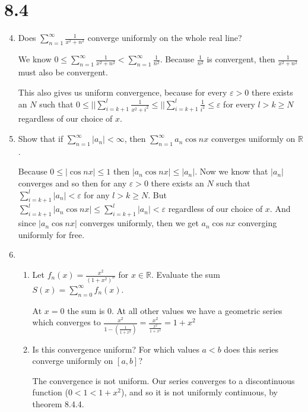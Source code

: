 \documentclass[letterpaper]{article}
\begin{document}
\renewcommand{\labelenumi}{\Alph{enumi}.}
\renewcommand{\labelenumii}{(\alph{enumii})}
\section*{8.4}
\begin{enumerate}
\setcounter{enumi}{3}
\item
Does $\sum\limits_{n=1}^\infty{\frac{1}{x^2+n^2}}$ converge uniformly on the whole real line?

We know $0\le\sum\limits_{n=1}^\infty{\frac{1}{x^2+n^2}} <\sum\limits_{n=1}^\infty{\frac{1}{n^2}}$.
Because $\frac{1}{n^2}$ is convergent, then $\frac{1}{x^2+n^2}$ must also be convergent.

This also gives us uniform convergence, because  for every $\varepsilon>0$ there exists an $N$ such that $0\le||\sum\limits_{i=k+1}^l{\frac{1}{x^2+i^2}}\le ||\sum\limits_{i=k+1}^l{\frac{1}{i^2}}\le \varepsilon$ for every $l>k\ge N$ regardless of our choice of $x$.
\item
Show that if $\sum\limits_{n=1}^\infty{\lvert a_n\rvert}<\infty$, then $\sum\limits_{n=1}^\infty{a_n\cos nx}$ converges uniformly on $\mathbb{R}$.

Because $0\le |\cos nx|\le 1$ then $|a_n\cos nx|\le |a_n|$. Now we know that $|a_n|$ converges and so then for any $\varepsilon>0$ there exists an $N$ such that $\sum\limits_{i=k+1}^l{|a_n|}<\varepsilon$ for any $l>k\ge N$. But $\sum\limits_{i=k+1}^l{|a_n\cos nx|}\le\sum\limits_{i=k+1}^l{|a_n|}<\varepsilon$ regardless of our choice of $x$. And since $|a_n\cos nx|$ converges uniformly, then we get $a_n\cos nx$ converging uniformly for free.
\item
  \begin{enumerate}
  \item
  Let $f_n(x)=\frac{x^2}{(1+x^2)^n}$ for $x\in \mathbb{R}$. Evaluate the sum $S(x)=\sum\limits_{n=0}^\infty{f_n(x)}$.

  At $x=0$ the sum is $0$. At all other values we have a geometric series which converges to $\frac{x^2}{1-(\frac{1}{1+x^2})}=\frac{x^2}{\frac{x^2}{1+x^2}}=1+x^2$
  \item
  Is this convergence uniform? For which values $a<b$ does this series converge uniformly on $[a,b]$?

  The convergence is not uniform. Our series converges to a discontinuous function ($0<1<1+x^2$), and so it is not uniformly continuous, by theorem 8.4.4.


\end{enumerate}
\end{enumerate}
\end{document}
